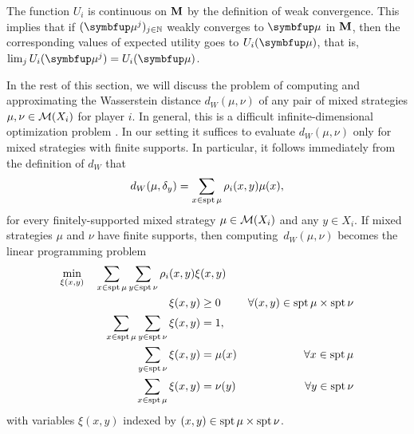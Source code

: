 The function $U_i$ is continuous on $\mathbf{M}$ by the definition of weak convergence. This implies that if $(\bmu^j)_{j\in\N}$ weakly converges to $\bmu$ in $\mathbf{M}$, then the corresponding values of expected utility goes to $U_i(\bmu)$, that is, $\lim_j U_i(\bmu^j) = U_i(\bmu)$.

In the rest of this section, we will discuss the problem of computing and approximating the Wasserstein distance $d_W(\mu,\nu)$ of any pair of mixed strategies $\mu,\nu\in \mathcal{M}(X_i)$ for player $i$. In general, this is a difficult infinite-dimensional optimization problem \cite{Peyre19}. In our setting it suffices to evaluate $d_W(\mu,\nu)$ only for mixed strategies with finite supports. In particular, it follows immediately from the definition of $d_W$ that
\[
	d_W(\mu,\delta_y)=\sum_{x\in \operatorname*{spt} \mu}\rho_i(x,y)\mu(x),
\]
for every finitely-supported mixed strategy $\mu\in \mathcal{M}(X_i)$ and any $y \in X_i$. If mixed strategies $\mu$ and $\nu$ have finite supports, then computing~$d_W(\mu,\nu)$ becomes the linear programming problem
\begin{equation}
	\label{def:LPobj}
	\begin{aligned}
	\min_{\xi(x,y)}\quad \sum_{x\in \operatorname*{spt} \mu} \sum_{y\in \operatorname*{spt} \nu} \rho_i(x,y) \xi&(x,y)\\
											\xi(x,y)  &\ge 0   &\forall (x,y)\in\operatorname*{spt} \mu \times \operatorname*{spt} \nu\\
		\sum_{x\in \operatorname*{spt} \mu} \sum_{y\in \operatorname*{spt} \nu}\xi(x,y)  &=1, \\
							\sum_{y\in \operatorname*{spt} \nu}\xi(x,y) &= \mu(x)  &\quad \forall x\in \operatorname*{spt} \mu \\
							\sum_{x\in \operatorname*{spt} \mu}\xi(x,y) &= \nu(y)  &\quad \forall y\in \operatorname*{spt} \nu
	\end{aligned}
\end{equation}
with variables $\xi(x,y)$ indexed by $(x,y)\in\operatorname*{spt} \mu \times \operatorname*{spt} \nu$.
